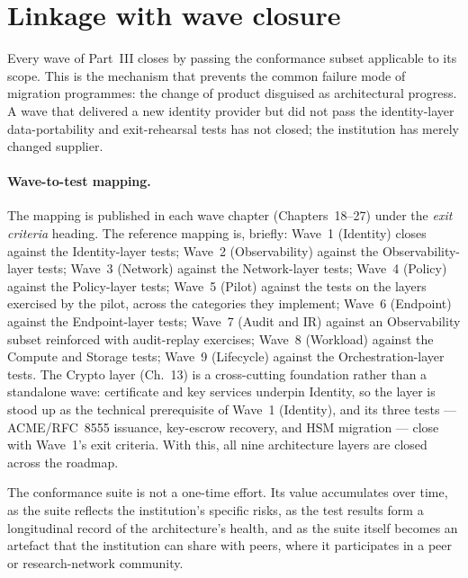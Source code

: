 \section{Linkage with wave closure}
\label{sec:cf-linkage}

Every wave of Part~III closes by passing the conformance subset
applicable to its scope. This is the mechanism that prevents the
common failure mode of migration programmes: the change of product
disguised as architectural progress. A wave that delivered a new
identity provider but did not pass the identity-layer
data-portability and exit-rehearsal tests has not closed; the
institution has merely changed supplier.

\paragraph{Wave-to-test mapping.} The mapping is published in each
wave chapter (Chapters~18--27) under the \emph{exit criteria}
heading. The reference mapping is, briefly:
Wave~1 (Identity) closes against the Identity-layer tests; Wave~2
(Observability) against the Observability-layer tests; Wave~3
(Network) against the Network-layer tests; Wave~4 (Policy) against
the Policy-layer tests; Wave~5 (Pilot) against the tests on the
layers exercised by the pilot, across the categories they implement;
Wave~6 (Endpoint) against the Endpoint-layer tests; Wave~7 (Audit and IR)
against an Observability subset reinforced with audit-replay
exercises; Wave~8 (Workload) against the Compute and Storage tests;
Wave~9 (Lifecycle) against the Orchestration-layer tests.
The Crypto layer (Ch.~13) is a cross-cutting foundation rather than a
standalone wave: certificate and key services underpin Identity, so
the layer is stood up as the technical prerequisite of Wave~1
(Identity), and its three tests --- ACME/RFC~8555 issuance,
key-escrow recovery, and HSM migration --- close with Wave~1's exit
criteria. With this, all nine architecture layers are closed across
the roadmap.

\medskip

\noindent The conformance suite is not a one-time effort. Its value
accumulates over time, as the suite reflects the institution's
specific risks, as the test results form a longitudinal record of
the architecture's health, and as the suite itself becomes an
artefact that the institution can share with peers, where it
participates in a peer or research-network community.
